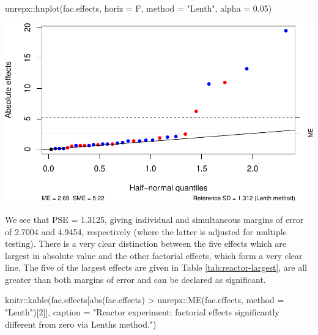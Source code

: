 \documentclass[
]{book}
\newenvironment{Shaded}{\begin{snugshade}}{\end{snugshade}}
\newcommand{\AttributeTok}[1]{\textcolor[rgb]{0.77,0.63,0.00}{#1}}
\newcommand{\DecValTok}[1]{\textcolor[rgb]{0.00,0.00,0.81}{#1}}
\newcommand{\FloatTok}[1]{\textcolor[rgb]{0.00,0.00,0.81}{#1}}
\newcommand{\FunctionTok}[1]{\textcolor[rgb]{0.00,0.00,0.00}{#1}}
\newcommand{\NormalTok}[1]{#1}
\newcommand{\SpecialCharTok}[1]{\textcolor[rgb]{0.00,0.00,0.00}{#1}}
\newcommand{\StringTok}[1]{\textcolor[rgb]{0.31,0.60,0.02}{#1}}
\theoremstyle{definition}
\theoremstyle{definition}
\theoremstyle{definition}
\theoremstyle{definition}
\theoremstyle{remark}
\begin{document}
\begin{Shaded}
\begin{Highlighting}[]
\NormalTok{unrepx}\SpecialCharTok{::}\FunctionTok{hnplot}\NormalTok{(fac.effects, }\AttributeTok{horiz =}\NormalTok{ F, }\AttributeTok{method =} \StringTok{"Lenth"}\NormalTok{, }\AttributeTok{alpha =} \FloatTok{0.05}\NormalTok{)}
\end{Highlighting}
\end{Shaded}

\includegraphics{bookdown_math3014-6027_files/figure-latex/reactor-lenth-1.pdf}

We see that PSE = 1.3125, giving individual and simultaneous margins of error of 2.7004 and 4.9454, respectively (where the latter is adjusted for multiple testing). There is a very clear distinction between the five effects which are largest in absolute value and the other factorial effects, which form a very clear line. The five of the largest effects are given in Table \ref{tab:reactor-largest}, are all greater than both margins of error and can be declared as significant.

\begin{Shaded}
\begin{Highlighting}[]
\NormalTok{knitr}\SpecialCharTok{::}\FunctionTok{kable}\NormalTok{(fac.effects[}\FunctionTok{abs}\NormalTok{(fac.effects) }\SpecialCharTok{\textgreater{}}\NormalTok{ unrepx}\SpecialCharTok{::}\FunctionTok{ME}\NormalTok{(fac.effects, }
                                                       \AttributeTok{method =} \StringTok{"Lenth"}\NormalTok{)[}\DecValTok{2}\NormalTok{]],}
             \AttributeTok{caption =} \StringTok{"Reactor experiment: factorial effects significantly different from zero via Lenth\textquotesingle{}s method."}\NormalTok{)}
\end{Highlighting}
\end{Shaded}
\end{document}

